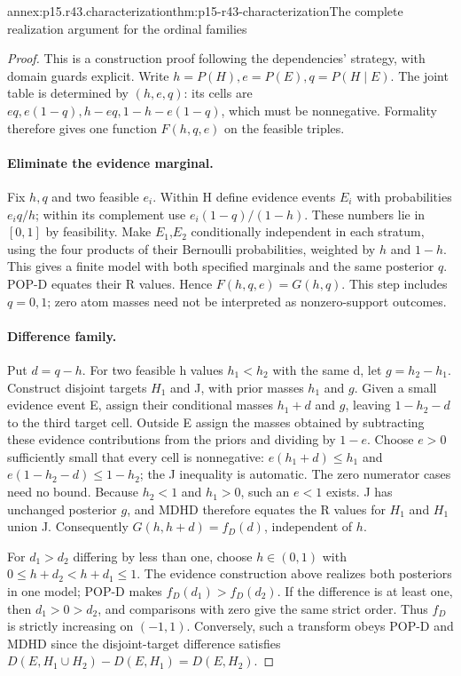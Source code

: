 \begin{annexitem}{annex:p15.r43.characterization}{thm:p15-r43-characterization}{The complete realization argument for the ordinal families}
\begin{proof}
This is a construction proof following the dependencies' strategy,
with domain guards explicit. Write \(h=P(H),e=P(E),q=P(H\mid E)\).
The joint table is determined by \((h,e,q)\): its cells are
\(eq,e(1-q),h-eq,1-h-e(1-q)\), which must be nonnegative.
Formality therefore gives one function \(F(h,q,e)\) on the feasible triples.

\paragraph{Eliminate the evidence marginal.}
Fix \(h,q\) and two feasible \(e_i\). Within H define evidence events \(E_i\)
with probabilities \(e_iq/h\); within its complement use
\(e_i(1-q)/(1-h)\). These numbers lie in \([0,1]\) by feasibility.
Make \(E_1\),\(E_2\) conditionally independent in each stratum, using the
four products of their Bernoulli probabilities, weighted by \(h\) and \(1-h\).
This gives a finite model with both specified marginals and the same
posterior \(q\). POP-D equates their R values. Hence \(F(h,q,e)=G(h,q)\).
This step includes \(q=0,1\); zero
atom masses need not be interpreted as nonzero-support outcomes.

\paragraph{Difference family.}
Put \(d=q-h\). For two feasible h values \(h_1<h_2\) with the same d,
let \(g=h_2-h_1\). Construct disjoint targets \(H_1\) and J, with prior
masses \(h_1\) and \(g\). Given a small evidence event E, assign their
conditional masses \(h_1+d\) and \(g\), leaving \(1-h_2-d\) to the third
target cell. Outside E assign the masses obtained by subtracting
these evidence contributions from the priors and dividing by \(1-e\).
Choose \(e>0\) sufficiently small that every cell is nonnegative:
\(e(h_1+d)\leq h_1\) and
\(e(1-h_2-d)\leq1-h_2\); the J inequality is automatic.
The zero numerator cases need no bound. Because \(h_2<1\) and \(h_1>0\),
such an \(e<1\) exists. J has unchanged posterior \(g\), and MDHD therefore
equates the R values for \(H_1\) and \(H_1\) union J. Consequently
\(G(h,h+d)=f_D(d)\), independent of \(h\).

For \(d_1>d_2\) differing by less than one, choose
\(h\in(0,1)\) with \(0\leq h+d_2<h+d_1\leq1\).
The evidence construction above realizes both posteriors in one model;
POP-D makes \(f_D(d_1)>f_D(d_2)\). If the difference is at least one,
then \(d_1>0>d_2\), and comparisons with zero give the same strict
order. Thus \(f_D\) is strictly increasing on \((-1,1)\). Conversely,
such a transform obeys POP-D and MDHD since the disjoint-target
difference satisfies \(D(E,H_1\cup H_2)-D(E,H_1)=D(E,H_2)\).


\end{proof}
\end{annexitem}
